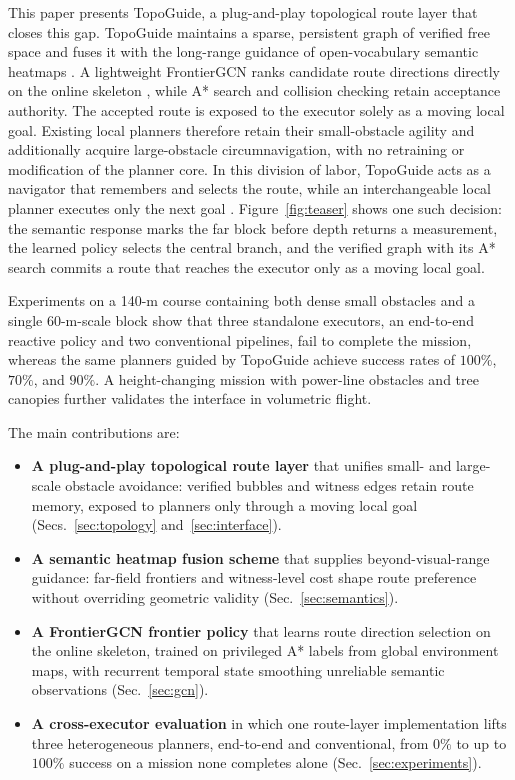 \documentclass[letterpaper,10pt,conference]{ieeeconf}
\begin{document}
This paper presents TopoGuide, a plug-and-play topological route
layer that closes this gap.  TopoGuide maintains a sparse, persistent
graph of verified free space \cite{bubble,epic} and fuses it with the
long-range guidance of open-vocabulary semantic heatmaps
\cite{pearl,clip}.  A lightweight FrontierGCN ranks candidate route
directions directly on the online skeleton \cite{kipf2017gcn}, while
A* search and collision checking retain acceptance authority.  The
accepted route is exposed to the executor solely as a moving
local goal.  Existing local planners therefore retain
their small-obstacle agility and additionally acquire large-obstacle
circumnavigation, with no retraining or modification of the planner
core.  In this division of labor, TopoGuide acts as a navigator that
remembers and selects the route, while an interchangeable local
planner executes only the next goal \cite{ving}.
Figure~\ref{fig:teaser} shows one such decision: the semantic response
marks the far block before depth returns a measurement, the learned
policy selects the central branch, and the verified graph with its A*
search commits a route that reaches the executor only as a moving local
goal.

Experiments on a 140-m course containing both dense small obstacles
and a single 60-m-scale block show that three standalone executors,
an end-to-end reactive policy and two conventional pipelines, fail to
complete the mission, whereas the same planners guided by TopoGuide
achieve success rates of $100\%$, $70\%$, and $90\%$.  A
height-changing mission with power-line obstacles and tree canopies
further validates the interface in volumetric flight.

The main contributions are:
\begin{itemize}
  \setlength\itemsep{0pt}
  \item \textbf{A plug-and-play topological route layer} that unifies
  small- and large-scale obstacle avoidance: verified bubbles and
  witness edges retain route memory, exposed to planners only through
  a moving local goal (Secs.~\ref{sec:topology}
  and~\ref{sec:interface}).
  \item \textbf{A semantic heatmap fusion scheme} that supplies
  beyond-visual-range guidance: far-field frontiers and witness-level
  cost shape route preference without overriding geometric validity
  (Sec.~\ref{sec:semantics}).
  \item \textbf{A FrontierGCN frontier policy} that learns route
  direction selection on the online skeleton, trained on privileged
  A* labels from global environment maps, with recurrent temporal
  state smoothing unreliable semantic observations
  (Sec.~\ref{sec:gcn}).
  \item \textbf{A cross-executor evaluation} in which one route-layer
  implementation lifts three heterogeneous planners, end-to-end and
  conventional, from $0\%$ to up to $100\%$ success on a mission none
  completes alone (Sec.~\ref{sec:experiments}).
\end{itemize}
\end{document}
